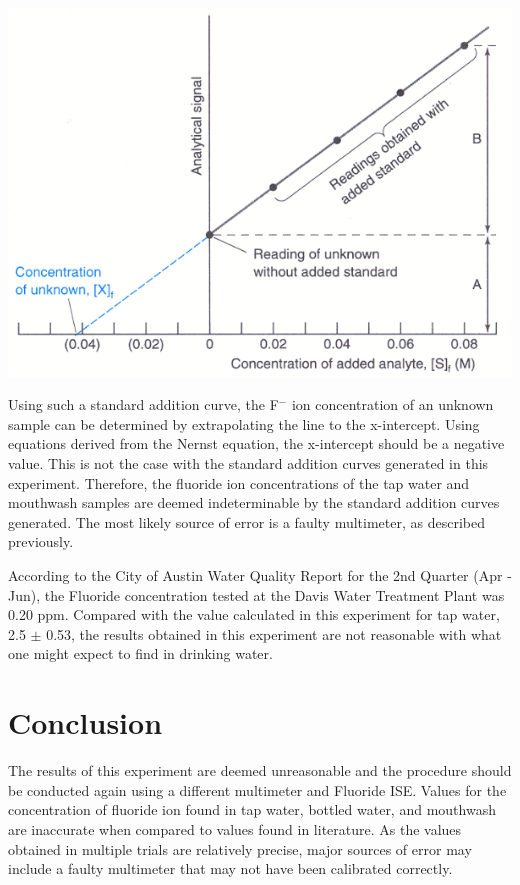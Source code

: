 \documentclass{article}
\begin{document}
\begin{center}
    \includegraphics[scale=0.5]{std}
\end{center}

Using such a standard addition curve, the F$^-$ ion concentration of an unknown
sample can be determined by extrapolating the line to the x-intercept. Using
equations derived from the Nernst equation, the x-intercept should be a negative
value. This is not the case with the standard addition curves generated in this
experiment. Therefore, the fluoride ion concentrations of the tap water and
mouthwash samples are deemed indeterminable by the standard addition curves
generated. The most likely source of error is a faulty multimeter, as described
previously.

According to the City of Austin Water Quality Report for the 2nd Quarter (Apr -
Jun), the Fluoride concentration tested at the Davis Water Treatment Plant was
0.20 ppm.\cite{atx} Compared with the value calculated in this experiment for tap water, 2.5 $\pm$ 0.53,
the results obtained in this experiment are not reasonable with what one might
expect to find in drinking water.

\section {Conclusion}
The results of this experiment are deemed unreasonable and the procedure should
be conducted again using a different multimeter and Fluoride ISE. Values for the
concentration of fluoride ion found in tap water, bottled water, and mouthwash
are inaccurate when compared to values found in literature. As the values
obtained in multiple trials are relatively precise, major sources of error may
include a faulty multimeter that may not have been calibrated correctly.
\end{document}
